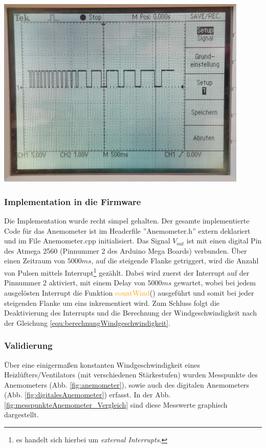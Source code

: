 {\begin{minipage}[b][650pt][t]{0.44\textwidth}
\label{fig:beschaltungAnemometer}
\vspace{20pt}
\includegraphics[width = 0.9\textwidth]{graphics/Anemometer/oszilloskop_anenometer_puls.png}
\label{fig:rechteckpuls_anemometer}
\end{minipage}}
\newpage

\subsubsection{Implementation in die Firmware}
Die Implementation wurde recht simpel gehalten. Der gesamte implementierte Code für das Anemometer ist im Headerfile ''Anemometer.h'' extern deklariert und im File Anemometer.cpp initialisiert. Das Signal $V_{out}$ ist mit einen digital Pin des Atmega 2560 (Pinnummer 2 des Arduino Mega Boards) verbunden. Über einen Zeitraum von $5000ms$, auf die steigende Flanke getriggert, wird die Anzahl von Pulsen mittels Interrupt\footnote{es handelt sich hierbei um \textit{external Interrupts}.} gezählt. Dabei wird zuerst der Interrupt auf der Pinnummer 2 aktiviert, mit einem Delay von $5000ms$ gewartet, wobei bei jedem ausgelösten Interrupt die Funktion \textcolor{orange}{countWind}() ausgeführt und somit bei jeder steigenden Flanke um eins inkrementiert wird. Zum Schluss folgt die Deaktivierung des Interrupts und die Berechnung der Windgeschwindigkeit nach der Gleichung \ref{equ:berechnungWindgeschwindigkeit}.\\

\subsubsection{Validierung}
Über eine einigermaßen konstanten Windgeschwindigkeit eines Heizlüfters/Ventilators (mit verschiedenen Stärkestufen) wurden Messpunkte des Anemometers (Abb. \ref{fig:anemometer}), sowie auch des digitalen Anemometers (Abb. \ref{fig:digitalesAnemometer}) erfasst. In der Abb. \ref{fig:messpunkteAnemometer_Vergleich} sind diese Messwerte graphisch dargestellt.\\

